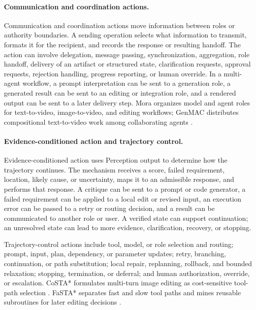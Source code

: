 \paragraph{Communication and coordination actions.}
Communication and coordination actions move information between roles or authority boundaries. A sending operation selects what information to transmit, formats it for the recipient, and records the response or resulting handoff. The action can involve delegation, message passing, synchronization, aggregation, role handoff, delivery of an artifact or structured state, clarification requests, approval requests, rejection handling, progress reporting, or human override. In a multi-agent workflow, a prompt interpretation can be sent to a generation role, a generated result can be sent to an editing or integration role, and a rendered output can be sent to a later delivery step. Mora organizes model and agent roles for text-to-video, image-to-video, and editing workflows; GenMAC distributes compositional text-to-video work among collaborating agents \cite{yuan2024mora,huang2024genmac}.

\paragraph{Evidence-conditioned action and trajectory control.}
Evidence-conditioned action uses Perception output to determine how the trajectory continues. The mechanism receives a score, failed requirement, location, likely cause, or uncertainty, maps it to an admissible response, and performs that response. A critique can be sent to a prompt or code generator, a failed requirement can be applied to a local edit or revised input, an execution error can be passed to a retry or routing decision, and a result can be communicated to another role or user. A verified state can support continuation; an unresolved state can lead to more evidence, clarification, recovery, or stopping.

Trajectory-control actions include tool, model, or role selection and routing; prompt, input, plan, dependency, or parameter updates; retry, branching, continuation, or path substitution; local repair, replanning, rollback, and bounded relaxation; stopping, termination, or deferral; and human authorization, override, or escalation. CoSTA* formulates multi-turn image editing as cost-sensitive tool-path selection \cite{gupta2025costa}. FaSTA* separates fast and slow tool paths and mines reusable subroutines for later editing decisions \cite{gupta2025fasta}. 


